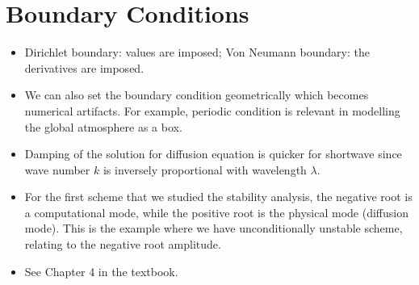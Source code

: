 \documentclass{article}
\begin{document}
\section{Boundary Conditions}
\begin{itemize}
    \item Dirichlet boundary: values are imposed; Von Neumann boundary: the derivatives are imposed.
    \item We can also set the boundary condition geometrically which becomes numerical artifacts. For example, periodic condition is relevant in modelling the global atmosphere as a box.
    \item Damping of the solution for diffusion equation is quicker for shortwave since wave number $k$ is inversely proportional with wavelength $\lambda$.
    \item For the first scheme that we studied the stability analysis, the negative root is a computational mode, while the positive root is the physical mode (diffusion mode). This is the example where we have unconditionally unstable scheme, relating to the negative root amplitude.
    \item See Chapter 4 in the textbook.
\end{itemize}
\end{document}
